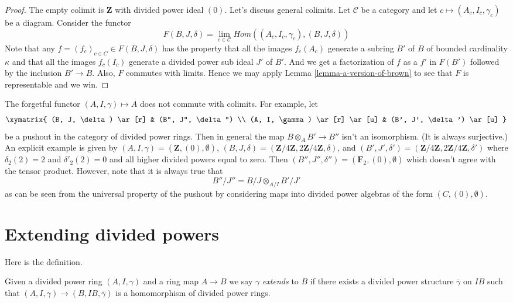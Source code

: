 \begin{proof}
The empty colimit is $\mathbf{Z}$ with divided power ideal $(0)$.
Let's discuss general colimits. Let $\mathcal{C}$ be a category and let
$c \mapsto (A_c, I_c, \gamma_c)$ be a diagram. Consider the functor
$$
F(B, J, \delta) = \lim_{c \in \mathcal{C}}
Hom((A_c, I_c, \gamma_c), (B, J, \delta))
$$
Note that any $f = (f_c)_{c \in C} \in F(B, J, \delta)$ has the property
that all the images $f_c(A_c)$ generate a subring $B'$ of $B$ of bounded
cardinality $\kappa$ and that all the images $f_c(I_c)$ generate a
divided power sub ideal $J'$ of $B'$. And we get a factorization of
$f$ as a $f'$ in $F(B')$ followed by the inclusion $B' \to B$. Also,
$F$ commutes with limits. Hence we may apply
Lemma \ref{lemma-a-version-of-brown}
to see that $F$ is representable and we win.
\end{proof}

\begin{remark}
\label{remark-forgetful}
The forgetful functor $(A, I, \gamma) \mapsto A$ does not commute with
colimits. For example, let
$$
\xymatrix{
(B, J, \delta) \ar[r] & (B'', J'', \delta'') \\
(A, I, \gamma) \ar[r] \ar[u] & (B', J', \delta') \ar[u]
}
$$
be a pushout in the category of divided power rings.
Then in general the map $B \otimes_A B' \to B''$ isn't an
isomorphism. (It is always surjective.)
An explicit example is given by
$(A, I, \gamma) = (\mathbf{Z}, (0), \emptyset)$,
$(B, J, \delta) = (\mathbf{Z}/4\mathbf{Z}, 2\mathbf{Z}/4\mathbf{Z}, \delta)$,
and
$(B', J', \delta') =
(\mathbf{Z}/4\mathbf{Z}, 2\mathbf{Z}/4\mathbf{Z}, \delta')$
where $\delta_2(2) = 2$ and $\delta'_2(2) = 0$ and all higher divided powers
equal to zero. Then $(B'', J'', \delta'') = (\mathbf{F}_2, (0), \emptyset)$
which doesn't agree with the tensor product. However, note that it is always
true that
$$
B''/J'' = B/J \otimes_{A/I} B'/J'
$$
as can be seen from the universal property of the pushout by considering
maps into divided power algebras of the form $(C, (0), \emptyset)$.
\end{remark}


\section{Extending divided powers}
\label{section-extend}

\noindent
Here is the definition.

\begin{definition}
\label{definition-extends}
Given a divided power ring $(A, I, \gamma)$ and a ring map
$A \to B$ we say $\gamma$ {\it extends} to $B$ if there exists a
divided power structure $\bar \gamma$ on $IB$ such that
$(A, I, \gamma) \to (B, IB, \bar\gamma)$ is a homomorphism of
divided power rings.
\end{definition}

